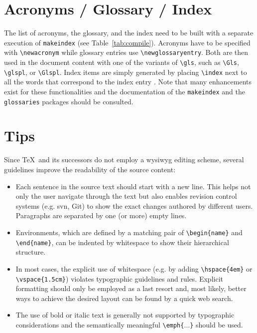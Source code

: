 \section{Acronyms / Glossary / Index}

The list of acronyms, the glossary, and the index need to be built with a separate execution of \verb|makeindex| (see Table~\ref{tab:compile}).
Acronyms have to be specified with \verb|\newacronym| while glossary entries use \verb|\newglossaryentry|.
Both are then used in the document content with one of the variants of \verb|\gls|, such as \verb|\Gls|, \verb|\glspl|, or \verb|\Glspl|.
Index items are simply generated by placing \verb|\index| next to all the words that correspond to the index entry .
Note that many enhancements exist for these functionalities and the documentation of the \verb|makeindex| and the \verb|glossaries| packages should be consulted.

\section{Tips}

Since \TeX\ and its successors do not employ a \gls{wysiwyg} editing scheme, several guidelines improve the readability of the source content:
\begin{itemize}
\item Each sentence in the source text should start with a new line.
      This helps not only the user navigate through the text but also enables revision control systems (e.g. \gls{svn}, Git) to show the exact changes authored by different users.
      Paragraphs are separated by one (or more) empty lines.
\item Environments, which are defined by a matching pair of \verb|\begin{name}| and \verb|\end{name}|, can be indented by whitespace to show their hierarchical structure.
\item In most cases, the explicit use of whitespace (e.g. by adding \verb|\hspace{4em}| or \verb|\vspace{1.5cm}|) violates typographic guidelines and rules.
      Explicit formatting should only be employed as a last resort and, most likely, better ways to achieve the desired layout can be found by a quick web search.
\item The use of bold or italic text is generally not supported by typographic considerations and the semantically meaningful \verb|\emph{|\texttt{$\dots$}\verb|}| should be used.
\end{itemize}

